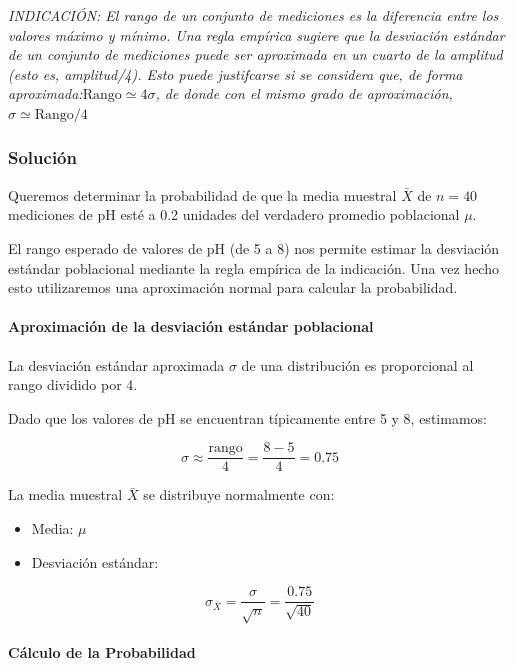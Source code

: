 \documentclass[
]{article}
\providecommand{\tightlist}{%
  \setlength{\itemsep}{0pt}\setlength{\parskip}{0pt}}
\begin{document}
\emph{INDICACIÓN: El rango de un conjunto de mediciones es la diferencia entre los valores máximo y mínimo. Una regla empírica sugiere que la desviación estándar de un conjunto de mediciones puede ser aproximada en un cuarto de la amplitud (esto es, amplitud/4). Esto puede justifcarse si se considera que, de forma aproximada:\(\mbox{Rango} \simeq 4\sigma\), de donde con el mismo grado de aproximación, \(\sigma \simeq \mbox{Rango} / 4\)}

\subsubsection{Solución}\label{soluciuxf3n-10}

Queremos determinar la probabilidad de que la media muestral \(\bar{X}\) de \(n = 40\) mediciones de pH esté a 0.2 unidades del verdadero promedio poblacional \(\mu\).

El rango esperado de valores de pH (de 5 a 8) nos permite estimar la desviación estándar poblacional mediante la regla empírica de la indicación. Una vez hecho esto utilizaremos una aproximación normal para calcular la probabilidad.

\paragraph{Aproximación de la desviación estándar poblacional}\label{aproximaciuxf3n-de-la-desviaciuxf3n-estuxe1ndar-poblacional}

La desviación estándar aproximada \(\sigma\) de una distribución es proporcional al rango dividido por 4.

Dado que los valores de pH se encuentran típicamente entre 5 y 8, estimamos:

\[
\sigma \approx \frac{\text{rango}}{4} = \frac{8 - 5}{4} = 0.75
\]

La media muestral \(\bar{X}\) se distribuye normalmente con:

\begin{itemize}
\tightlist
\item
  Media: \(\mu\)
\item
  Desviación estándar:
\end{itemize}

\[
\sigma_{\bar{X}} = \frac{\sigma}{\sqrt{n}} = \frac{0.75}{\sqrt{40}}
\]

\paragraph{Cálculo de la Probabilidad}\label{cuxe1lculo-de-la-probabilidad-1}
\end{document}
